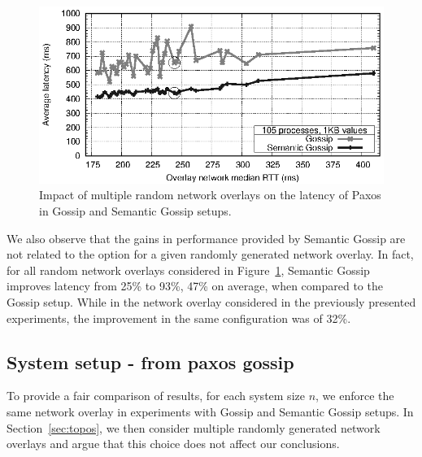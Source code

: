 \begin{figure}[]
\centering
\includegraphics[width=\columnwidth]{figures/lat-rtt.eps}
\caption{Impact of multiple random network overlays on the latency of Paxos in
	Gossip and Semantic Gossip setups.}
\label{fig:topos}
\end{figure}

We also observe that the gains in performance provided by Semantic Gossip are
not related to the option for a given randomly generated network overlay.
In fact, for all random network overlays considered in Figure~\ref{fig:topos}, 
Semantic Gossip improves latency from 25\% to 93\%, 47\% on average, when
compared to the Gossip setup.
While in the network overlay considered in the previously presented
experiments, the improvement in the same configuration was of 32\%.


\subsection{System setup - from paxos gossip}


To provide a fair comparison of results, for each system size $n$, we enforce
the same network overlay in experiments with Gossip and Semantic Gossip setups.
%
In Section~\ref{sec:topos}, we then consider multiple randomly generated
network overlays and argue that this choice does not affect our conclusions.


